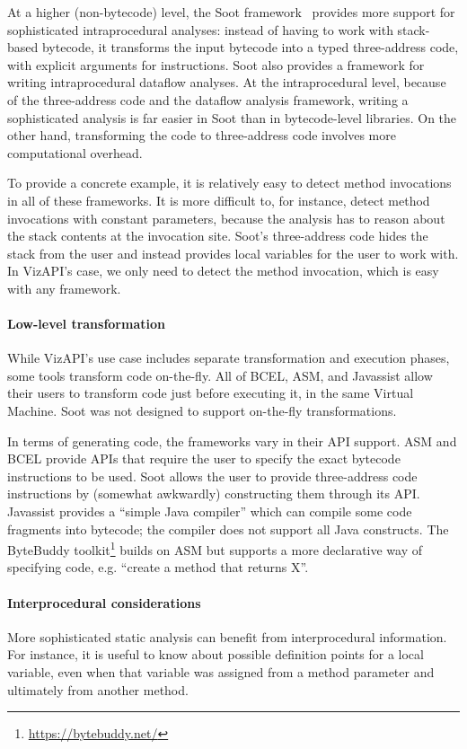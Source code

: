 At a higher (non-bytecode) level, the Soot
framework~\cite{lam11:_soot_java} provides more support for
sophisticated intraprocedural analyses: instead of having to work with
stack-based bytecode, it transforms the input bytecode into a typed
three-address code, with explicit arguments for instructions. Soot
also provides a framework for writing intraprocedural dataflow
analyses.  At the intraprocedural level, because of the three-address
code and the dataflow analysis framework, writing a sophisticated
analysis is far easier in Soot than in bytecode-level libraries. On
the other hand, transforming the code to three-address code involves
more computational overhead.

To provide a concrete example, it is relatively easy to detect method
invocations in all of these frameworks. It is more difficult to, for
instance, detect method invocations with constant parameters, because
the analysis has to reason about the stack contents at the invocation
site. Soot's three-address code hides the stack from the user and instead provides local variables for the
user to work with. In VizAPI's
case, we only need to detect the method invocation, which is easy
with any framework.

\paragraph{Low-level transformation}
While VizAPI's use case includes separate transformation and execution
phases, some tools transform code on-the-fly. All of BCEL, ASM,
and Javassist allow their users to transform code just before executing it,
in the same Virtual Machine. Soot was not designed to support on-the-fly
transformations.

In terms of generating code, the frameworks vary in their API support.
ASM and BCEL provide APIs that require the user to specify the exact
bytecode instructions to be used. Soot allows the user to provide
three-address code instructions by (somewhat awkwardly) constructing
them through its API. Javassist provides a ``simple Java compiler''
which can compile some code fragments into bytecode; the compiler does
not support all Java constructs.  The ByteBuddy
toolkit\footnote{\url{https://bytebuddy.net/}} builds on ASM but
supports a more declarative way of specifying code, e.g. ``create a
method that returns X''.

\paragraph{Interprocedural considerations}
More sophisticated static analysis can benefit from interprocedural
information. For instance, it is useful to know about possible
definition points for a local variable, even when that variable
was assigned from a method parameter and ultimately from another method.

